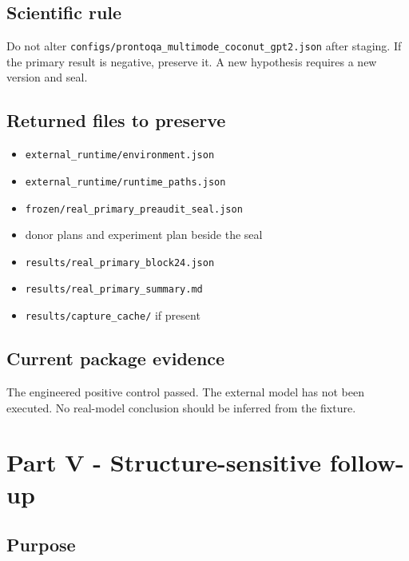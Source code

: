 \documentclass[
  10pt,
]{article}
\providecommand{\tightlist}{%
  \setlength{\itemsep}{0pt}\setlength{\parskip}{0pt}}
\begin{document}
\subsection{Scientific rule}\label{scientific-rule}

Do not alter \texttt{configs/prontoqa\_multimode\_coconut\_gpt2.json}
after staging. If the primary result is negative, preserve it. A new
hypothesis requires a new version and seal.

\subsection{Returned files to
preserve}\label{returned-files-to-preserve}

\begin{itemize}
\tightlist
\item
  \texttt{external\_runtime/environment.json}
\item
  \texttt{external\_runtime/runtime\_paths.json}
\item
  \texttt{frozen/real\_primary\_preaudit\_seal.json}
\item
  donor plans and experiment plan beside the seal
\item
  \texttt{results/real\_primary\_block24.json}
\item
  \texttt{results/real\_primary\_summary.md}
\item
  \texttt{results/capture\_cache/} if present
\end{itemize}

\subsection{Current package evidence}\label{current-package-evidence}

The engineered positive control passed. The external model has not been
executed. No real-model conclusion should be inferred from the fixture.

\newpage

\section{Part V - Structure-sensitive
follow-up}\label{part-v---structure-sensitive-follow-up}

\subsection{Purpose}\label{purpose-1}
\end{document}
